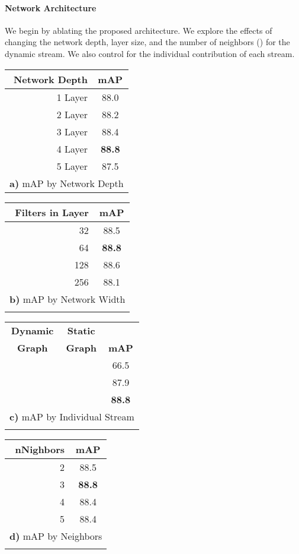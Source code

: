 \documentclass[10pt,twocolumn,letterpaper]{article}
\newcommand{\cmark}{\ding{51}}\newcommand{\xmark}{\ding{55}}
\begin{document}
\paragraph{Network Architecture} We begin by ablating the proposed architecture. We explore the effects of changing the network depth, layer size, and the number of neighbors () for the dynamic stream. We also control for the individual contribution of each stream.

\begin{table*}[t]
\small
\centering
\begin{tabular}{r c }
\hline
\textbf{Network Depth}  & \textbf{mAP} \\
\hline 
1 Layer & 88.0 \\
2 Layer & 88.2 \\
3 Layer & 88.4 \\
4 Layer & \textbf{88.8} \\
5 Layer & 87.5 \\
\hline
\multicolumn{2}{c}{ \textbf{a)} mAP by Network Depth}
\end{tabular}
\quad
\quad
\begin{tabular}{r c }
\hline
\textbf{Filters in Layer}  & \textbf{mAP} \\
\hline 
32 & 88.5 \\
64 & \textbf{88.8} \\
128 & 88.6\\
256 & 88.1\\
\hline
\multicolumn{2}{c}{\textbf{b)} mAP by Network Width} \\
& \\
\end{tabular}
\quad
\quad
\begin{tabular}{c c c}
\hline
\textbf{Dynamic}  & \textbf{Static}  &  \\
\textbf{Graph}  & \textbf{Graph}  & \textbf{mAP} \\
\hline 
\cmark & \xmark  & 66.5 \\
\xmark & \cmark & 87.9 \\
\cmark & \cmark & \textbf{88.8}\\
\hline
\multicolumn{3}{c}{\textbf{c)} mAP by Individual Stream} \\
& & \\
\end{tabular}
\quad
\quad
\begin{tabular}{r c }
\hline
\textbf{nNighbors}  & \textbf{mAP} \\
\hline 
2 & 88.5\\
3 & \textbf{88.8}\\
4 & 88.4\\
5 & 88.4\\
\hline
\multicolumn{2}{c}{\textbf{d)} mAP by Neighbors } \\
& \\
\end{tabular}
\\


\end{table*}
\end{document}
